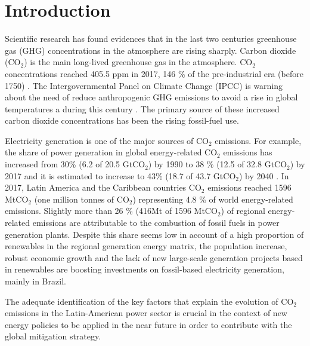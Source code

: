 \documentclass[energies,article,accept,moreauthors,12pt,a4paper]{mdpi} %
\begin{document}
\section{Introduction}

\label{Introduction}

Scientific research has found evidences that in the last two centuries greenhouse gas (GHG) concentrations in the atmosphere are rising sharply. Carbon dioxide (CO$_2$) is the main long-lived greenhouse gas in the atmosphere. CO$_2$ concentrations reached 405.5 ppm in 2017, 146 \% of the pre-industrial era (before 1750) \cite{WMO}. The Intergovernmental Panel on Climate Change (IPCC) is warning about the need of reduce anthropogenic GHG emissions  to avoid a rise in global temperatures a during this century \cite{2007IPCC}. The primary source of these increased carbon dioxide concentrations has been the rising fossil-fuel use. 

Electricity generation is one of the major sources of  CO$_2$ emissions. For example, the share of power generation in global energy-related CO$_2$ emissions has increased from
30\% (6.2 of 20.5 GtCO$_2$) by 1990 to 38 \% (12.5 of 32.8 GtCO$_2$) by 2017 \cite{IEAEnergyCombution2019} and it is estimated to increase to 43\% (18.7 of 43.7 GtCO$_2$) by 2040 \cite{weio2014}. In 2017, Latin America and the Caribbean countries CO$_2$ emissions reached 1596 MtCO$_2$ (one million tonnes of CO$_2$) representing 4.8 \% of world energy-related emissions. Slightly more than 26 \% (416Mt of 1596 MtCO$_2$) of regional energy-related emissions are attributable to the combustion of fossil fuels in power generation plants. Despite this share seems low in account of a high proportion of renewables in the regional generation energy matrix,  the population increase, robust economic  growth and the lack of new large-scale generation projects based in renewables are boosting investments on fossil-based electricity generation, mainly in Brazil.

The adequate identification of the key factors that explain the evolution of CO$_2$ emissions  in the Latin-American power sector is crucial in the context of new energy policies to be applied in the near future in order to contribute with the global mitigation strategy. 
\end{document}
